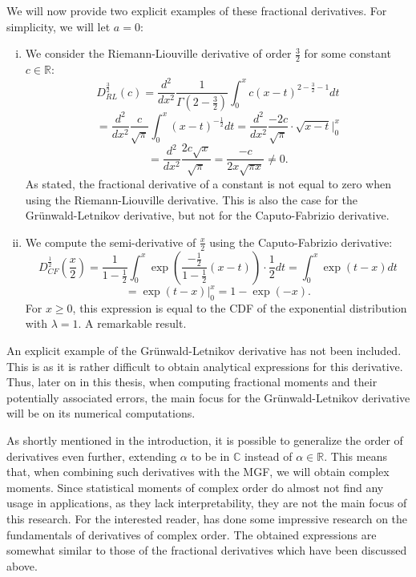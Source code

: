We will now provide two explicit examples of these fractional derivatives. For simplicity, we will let \(a = 0\):
\begin{example}
    \begin{enumerate}[(i)]
        \item 
    
    We consider the Riemann-Liouville derivative of order \(\frac{3}{2}\) for some constant \(c \in \mathbb{R}\):
    \[D^{\frac{3}{2}}_{RL}(c) = \frac{d^2}{dx^2} \frac{1}{\Gamma(2 - \frac{3}{2})}  \int_{0}^{x} c (x-t)^{2 - \frac{3}{2}-1}  dt\]
    \[= \frac{d^2}{dx^2} \frac{c}{\sqrt{\pi}}  \int_{0}^{x} (x-t)^{- \frac{1}{2}} dt = \frac{d^2}{dx^2} \frac{-2c}{\sqrt{\pi}} \cdot \sqrt{x - t} \Big|_{0}^{x}\]
    \[= \frac{d^2}{dx^2} \frac{2c \sqrt{x}}{\sqrt{\pi}} = \frac{-c}{2x\sqrt{\pi x}} \neq 0.\] As stated, the fractional derivative of a constant is not equal to zero when using the Riemann-Liouville derivative. This is also the case for the Grünwald-Letnikov derivative, but not for the Caputo-Fabrizio derivative.
    \item We compute the semi-derivative of \(\frac{x}{2}\) using the Caputo-Fabrizio derivative:
    \[D^{\frac{1}{2}}_{CF}\left(\frac{x}{2}\right) = \frac{1}{1 - \frac{1}{2}}  \int_{0}^{x} \exp\left(\frac{-\frac{1}{2}}{1 - \frac{1}{2}}(x-t)\right) \cdot \frac{1}{2} dt = \int_{0}^{x} \exp(t - x) dt\]
    \[ =  \exp(t - x) \Big|_{0}^{x} = 1 - \exp(- x).\]
    For \(x \geq 0\), this expression is equal to the CDF of the exponential distribution with \(\lambda = 1\). A remarkable result.
    
    \end{enumerate}
\end{example}
An explicit example of the Grünwald-Letnikov derivative has not been included. This is as it is rather difficult to obtain analytical expressions for this derivative. Thus, later on in this thesis, when computing fractional moments and their potentially associated errors, the main focus for the Grünwald-Letnikov derivative will be on its numerical computations.
\begin{remark}
    
As shortly mentioned in the introduction, it is possible to generalize the order of derivatives even further, extending \(\alpha\) to be in \(\mathbb{C}\) instead of \(\alpha \in \mathbb{R}\). This means that, when combining such derivatives with the MGF, we will obtain complex moments. Since statistical moments of complex order do almost not find any usage in applications, as they lack interpretability, they are not the main focus of this research. For the interested reader, \citet{love1971} has done some impressive research on the fundamentals of derivatives of complex order. The obtained expressions are somewhat similar to those of the fractional derivatives which have been discussed above.
\end{remark}